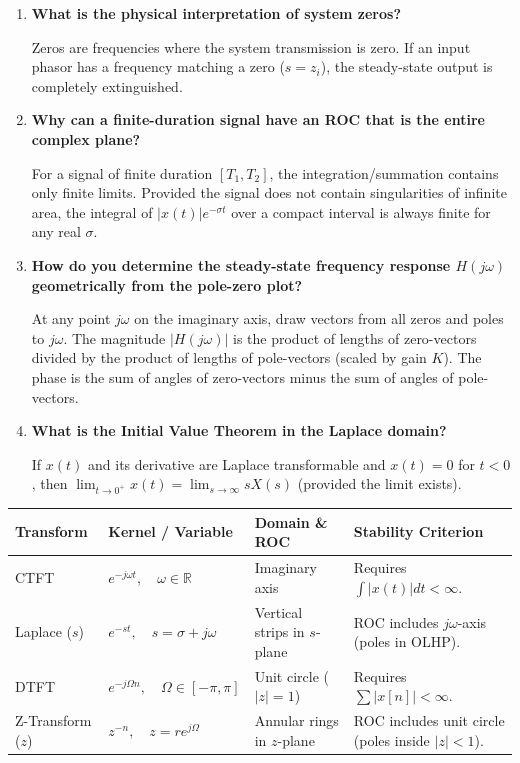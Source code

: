 \documentclass[12pt,a4paper]{article}
\newcommand{\Q}[1]{\textbf{#1}\par\noindent\ignorespaces}
\renewcommand{\arraystretch}{1.45}
\begin{document}
\begin{tcolorbox}[exambox, title={\textbf{Frequently Asked / Viva Questions}}]
\begin{enumerate}[topsep=0pt, label=\textbf{Q\arabic*.}, itemsep=5pt]
  \item \Q{What is the physical interpretation of system zeros?}
  Zeros are frequencies where the system transmission is zero. If an input phasor has a frequency matching a zero ($s = z_i$), the steady-state output is completely extinguished.

  \item \Q{Why can a finite-duration signal have an ROC that is the entire complex plane?}
  For a signal of finite duration $[T_1, T_2]$, the integration/summation contains only finite limits. Provided the signal does not contain singularities of infinite area, the integral of $|x(t)|e^{-\sigma t}$ over a compact interval is always finite for any real $\sigma$.

  \item \Q{How do you determine the steady-state frequency response $H(j\omega)$ geometrically from the pole-zero plot?}
  At any point $j\omega$ on the imaginary axis, draw vectors from all zeros and poles to $j\omega$. The magnitude $|H(j\omega)|$ is the product of lengths of zero-vectors divided by the product of lengths of pole-vectors (scaled by gain $K$). The phase is the sum of angles of zero-vectors minus the sum of angles of pole-vectors.

  \item \Q{What is the Initial Value Theorem in the Laplace domain?}
  If $x(t)$ and its derivative are Laplace transformable and $x(t) = 0$ for $t < 0$, then $\lim_{t \to 0^+} x(t) = \lim_{s \to \infty} s X(s)$ (provided the limit exists).
\end{enumerate}
\end{tcolorbox}

\begin{tcolorbox}[tikzbox, title={\textbf{Summary Matrix: Comprehensive Comparison of Transforms}}]
\par\vspace{4pt}\noindent
\begingroup
\setlength{\tabcolsep}{4pt}
\setlength{\extrarowheight}{3pt}
\renewcommand{\arraystretch}{1.35}
\begin{tabularx}{\linewidth}{|B{2.5cm}|B{3.2cm}|B{3.2cm}|Y|}
\hline
\textbf{Transform} & \textbf{Kernel / Variable} & \textbf{Domain \& ROC} & \textbf{Stability Criterion} \\
\hline
CTFT & $e^{-j\omega t}, \quad \omega \in \mathbb{R}$ & Imaginary axis & Requires $\int |x(t)|dt < \infty$. \\
\hline
Laplace ($s$) & $e^{-st}, \quad s = \sigma + j\omega$ & Vertical strips in $s$-plane & ROC includes $j\omega$-axis (poles in OLHP). \\
\hline
DTFT & $e^{-j\Omega n}, \quad \Omega \in [-\pi, \pi]$ & Unit circle ($|z|=1$) & Requires $\sum |x[n]| < \infty$. \\
\hline
Z-Transform ($z$) & $z^{-n}, \quad z = r e^{j\Omega}$ & Annular rings in $z$-plane & ROC includes unit circle (poles inside $|z|<1$). \\
\hline
\end{tabularx}
\endgroup
\end{tcolorbox}
\end{document}
